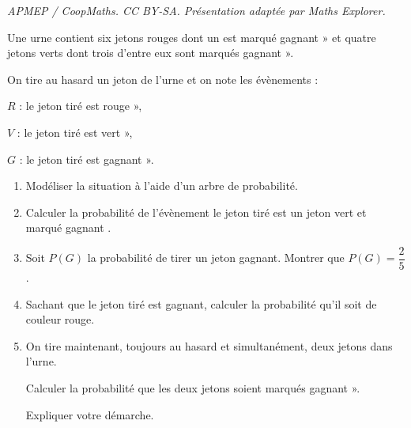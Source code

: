\documentclass[10pt]{article}
\begin{document}
\noindent\textit{APMEP / CoopMaths. CC BY-SA. Présentation adaptée par Maths Explorer.}\par\medskip
\bigskip

Une urne contient six jetons rouges dont un est marqué \og gagnant » et quatre jetons verts dont trois d'entre eux sont marqués \og gagnant ».

\begin{list}{}{On tire au hasard un jeton de l'urne et on note les évènements :}
\item $R$ : \og le jeton tiré est rouge »,
\item $V$ : \og le jeton tiré est vert »,
\item $G$ : \og le jeton tiré est gagnant ».
\end{list}

\medskip

\begin{enumerate}
\item  Modéliser la situation à l'aide d'un arbre de probabilité.

\item Calculer la probabilité de l'évènement \og le jeton tiré est un jeton vert et marqué gagnant \fg.

\item Soit $P(G)$ la probabilité de tirer un jeton gagnant. Montrer que $P(G) = \dfrac{2}{5}$.

\item Sachant que le jeton tiré est gagnant, calculer la probabilité qu'il soit de couleur rouge.

\item On tire maintenant, toujours au hasard et simultanément, deux jetons dans l'urne.

Calculer la probabilité que les deux jetons soient marqués \og gagnant ». 

Expliquer votre démarche.
\end{enumerate}

\vspace{0.5cm}
\end{document}
